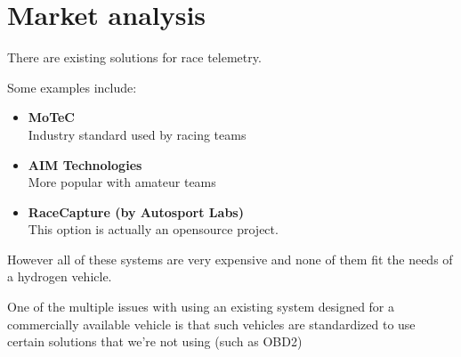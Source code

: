 \clearpage
\section{Market analysis}

There are existing solutions for race telemetry.

Some examples include:
\begin{itemize}
    \item[]
          {\large\textbf{MoTeC}}\\
          Industry standard used by racing teams

    \item[]
          {\large\textbf{AIM Technologies}}\\
          More popular with amateur teams

    \item[]
          {\large\textbf{RaceCapture (by Autosport Labs)}}\\
          This option is actually an opensource project.
\end{itemize}

However all of these systems are very expensive and none of them fit the needs
of a hydrogen vehicle.

One of the multiple issues with using an existing system designed for a
commercially available vehicle is that such vehicles are standardized to use
certain solutions that we're not using (such as OBD2)